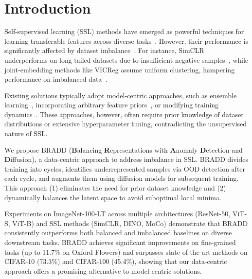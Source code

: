 \section{Introduction}
\label{sec:intro}

Self-supervised learning (SSL) methods have emerged as powerful techniques for learning transferable features across diverse tasks~\cite{chen2020simple, DINO, oquab2023dinov2}. However, their performance is significantly affected by dataset imbalance~\cite{assran2210hidden, tian2021divide, ts}. For instance, SimCLR underperforms on long-tailed datasets due to insufficient negative samples~\cite{tian2021divide}, while joint-embedding methods like VICReg assume uniform clustering, hampering performance on imbalanced data~\cite{assran2210hidden}.

Existing solutions typically adopt model-centric approaches, such as ensemble learning~\cite{tian2021divide}, incorporating arbitrary feature priors~\cite{assran2210hidden}, or modifying training dynamics~\cite{ts}. These approaches, however, often require prior knowledge of dataset distributions or extensive hyperparameter tuning, contradicting the unsupervised nature of SSL.

We propose BRADD (\textbf{B}alancing \textbf{R}epresentations with \textbf{A}nomaly \textbf{D}etection and \textbf{D}iffusion), a data-centric approach to address imbalance in SSL. BRADD divides training into cycles, identifies underrepresented samples via OOD detection after each cycle, and augments them using diffusion models for subsequent training. This approach (1) eliminates the need for prior dataset knowledge and (2) dynamically balances the latent space to avoid suboptimal local minima.

Experiments on ImageNet-100-LT across multiple architectures (ResNet-50, ViT-S, ViT-B) and SSL methods (SimCLR, DINO, MoCo) demonstrate that BRADD consistently outperforms both balanced and imbalanced baselines on diverse downstream tasks. BRADD achieves significant improvements on fine-grained tasks (up to 11.7\% on Oxford Flowers) and surpasses state-of-the-art methods on CIFAR-10 (73.3\%) and CIFAR-100 (45.4\%), showing that our data-centric approach offers a promising alternative to model-centric solutions.